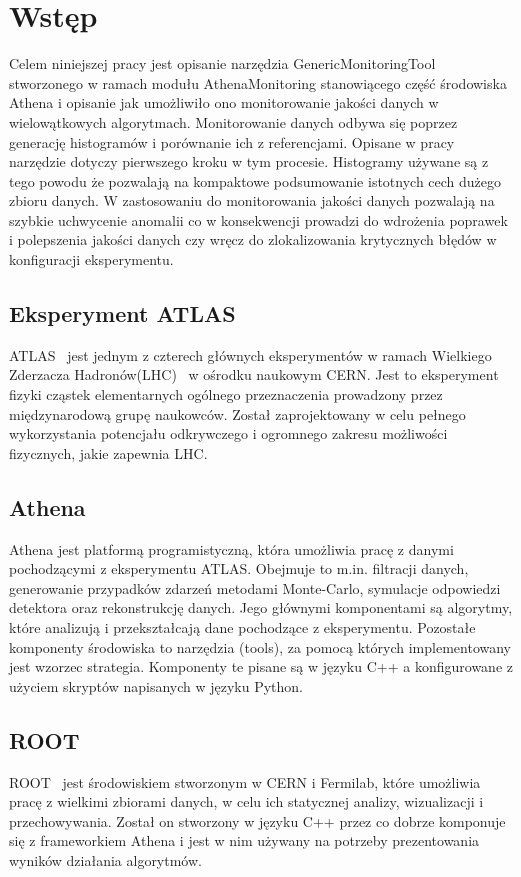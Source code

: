 \section{Wstęp}
Celem niniejszej pracy jest opisanie narzędzia \mbox{GenericMonitoringTool} stworzonego w ramach modułu \mbox{AthenaMonitoring} stanowiącego część środowiska Athena\cite{Athena} i opisanie jak umożliwiło ono monitorowanie jakości danych w wielowątkowych algorytmach. 
Monitorowanie danych odbywa się poprzez generację histogramów i porównanie ich z referencjami. Opisane w pracy narzędzie dotyczy pierwszego kroku w tym procesie.
Histogramy używane są z tego powodu że pozwalają na kompaktowe podsumowanie istotnych cech dużego zbioru danych. 
W zastosowaniu do monitorowania jakości danych pozwalają na szybkie uchwycenie anomalii co w konsekwencji prowadzi do wdrożenia poprawek i polepszenia jakości danych czy wręcz do zlokalizowania krytycznych błędów w konfiguracji eksperymentu. 

\subsection{Eksperyment ATLAS} 
ATLAS~\cite{} jest jednym z czterech głównych eksperymentów w ramach Wielkiego Zderzacza Hadronów(LHC)~\cite{} w ośrodku naukowym CERN. Jest to eksperyment fizyki cząstek elementarnych ogólnego przeznaczenia prowadzony przez międzynarodową grupę naukowców. Został zaprojektowany w celu pełnego wykorzystania potencjału odkrywczego i ogromnego zakresu możliwości fizycznych, jakie zapewnia LHC.

\subsection{Athena} 
Athena jest platformą programistyczną, która umożliwia pracę z danymi pochodzącymi z eksperymentu ATLAS. Obejmuje to m.in. filtracji danych, generowanie przypadków zdarzeń metodami Monte-Carlo, symulacje odpowiedzi detektora oraz rekonstrukcję danych. Jego głównymi komponentami są algorytmy, które analizują i przekształcają dane pochodzące z eksperymentu. Pozostałe komponenty środowiska to narzędzia (tools), za pomocą których implementowany jest wzorzec strategia.  Komponenty te pisane są w języku C++ a konfigurowane z użyciem skryptów napisanych w języku Python. 

\subsection{ROOT} 
ROOT~\cite{} jest środowiskiem stworzonym w CERN i Fermilab, które umożliwia pracę z wielkimi zbiorami danych, w celu ich statycznej analizy, wizualizacji i przechowywania. Został on stworzony w języku C++ przez co dobrze komponuje się z frameworkiem Athena i jest w nim używany na potrzeby prezentowania wyników działania algorytmów. 

